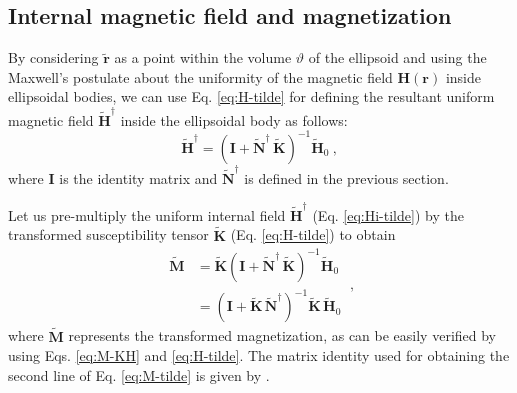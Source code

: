\documentclass[gmd, manuscript]{copernicus}
\providecommand{\DIFaddbegin}{} %
\begin{document}
\subsection{Internal magnetic field and magnetization}


By considering $\tilde{\mathbf{r}}$ as a point within the
volume $\vartheta$ of the ellipsoid and using the Maxwell's postulate
about the uniformity of the magnetic field $\mathbf{H}(\mathbf{r})$
inside ellipsoidal bodies, we can use Eq. \ref{eq:H-tilde}
for defining the resultant uniform magnetic field $\tilde{\mathbf{H}}^{\dagger}$
inside the ellipsoidal body as follows:
\begin{equation}
\tilde{\mathbf{H}}^{\dagger} =
\left( \mathbf{I} + \tilde{\mathbf{N}}^{\dagger} \, \tilde{\mathbf{K}} \right)^{-1}
\tilde{\mathbf{H}}_{0} \: ,
\label{eq:Hi-tilde}
\end{equation}
where $\mathbf{I}$ is the identity matrix and
$\tilde{\mathbf{N}}^{\dagger}$ is defined in the
previous section.

Let us pre-multiply the uniform internal field $\tilde{\mathbf{H}}^{\dagger}$
(Eq. \ref{eq:Hi-tilde}) by the transformed
susceptibility tensor $\tilde{\mathbf{K}}$
(Eq. \ref{eq:H-tilde}) to obtain
\begin{equation}
\begin{split}
\tilde{\mathbf{M}}
&= \tilde{\mathbf{K}}
\left( \mathbf{I} + \tilde{\mathbf{N}}^{\dagger} \, \tilde{\mathbf{K}} \right)^{-1}
\tilde{\mathbf{H}}_{0} \\
&=
\left( \mathbf{I} + \tilde{\mathbf{K}} \, \tilde{\mathbf{N}}^{\dagger} \right)^{-1}
\tilde{\mathbf{K}} \, \tilde{\mathbf{H}}_{0}
\end{split} \: ,
\label{eq:M-tilde}
\end{equation}
where $\tilde{\mathbf{M}}$
represents the transformed magnetization, as can be easily
verified by using Eqs. \ref{eq:M-KH} and \ref{eq:H-tilde}.
The matrix identity used for obtaining the second line of Eq.
\ref{eq:M-tilde} is given by \citet[p. ~151]{searle1982}.
\DIFaddbegin 
\end{document}

